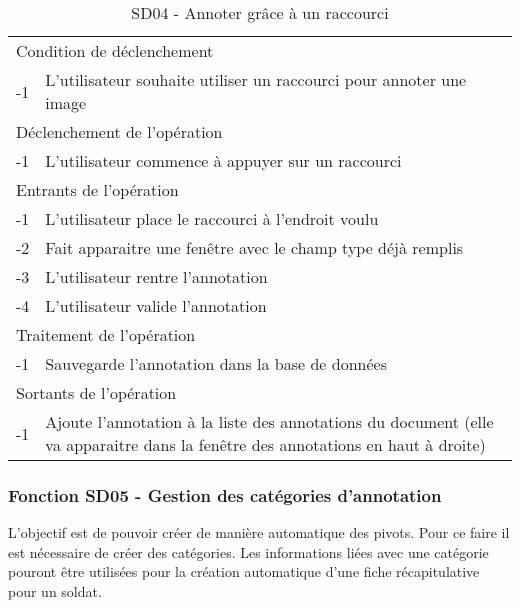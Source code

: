 \documentclass[a4paper]{article}
\begin{document}
\begin{table}[H]
  \centering
   \small
	\begin{tabular}{|c|p{12cm}|}
   		\hline
   			\rowcolor{lightgray}\multicolumn{2}{|c|}{\textbf{SD04 - Annoter grâce à un raccourci}} \\
   		\hline
   			\multicolumn{2}{|l|}{Condition de d\'eclenchement} \\
   		\hline
   			-1 & L’utilisateur souhaite utiliser un raccourci pour annoter une image\\
   		\hline
   			\multicolumn{2}{|l|}{D\'eclenchement de l'op\'eration} \\
   		\hline
   			-1 & L’utilisateur commence à appuyer sur un raccourci\\
   		\hline
   			\multicolumn{2}{|l|}{Entrants de l'op\'eration} \\
   		\hline
   			-1 & L’utilisateur place le raccourci à l’endroit voulu\\
			-2 & Fait apparaitre une fenêtre avec le champ type déjà remplis\\
			-3 & L’utilisateur rentre l’annotation\\
			-4 & L’utilisateur valide l’annotation\\
   		\hline
   			\multicolumn{2}{|l|}{Traitement de l'op\'eration} \\
  		\hline
   			-1 & Sauvegarde l’annotation dans la base de données\\
   		\hline
   			\multicolumn{2}{|l|}{Sortants de l'op\'eration} \\
   		\hline
   			-1 & Ajoute l’annotation à la liste des annotations du document (elle va apparaitre dans la fenêtre des annotations en haut à droite)\\
   		\hline
	\end{tabular}
  \caption{SD04 - Annoter grâce à un raccourci}
  \normalsize
  \label{tab:utiliser_raccourci}
\end{table}

\subsubsection{Fonction SD05 - Gestion des cat\'egories d'annotation}


L'objectif est de pouvoir cr\'eer de mani\`ere automatique des pivots. Pour ce faire il est n\'ecessaire de cr\'eer des cat\'egories. Les informations li\'ees avec une cat\'egorie pouront \^etre utilis\'ees pour la cr\'eation automatique d'une fiche r\'ecapitulative pour un soldat.\\
\end{document}

